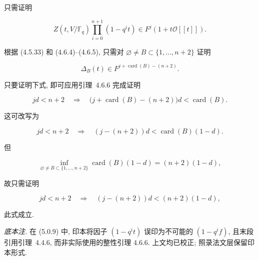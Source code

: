 只需证明

\begin{equation}\tag{5.0.11}
Z(t,V/\mathbb F_q)\prod_{i=0}^{n+1}(1-q^it)
\in F^j(1+t\mathcal O[[t]]).
\end{equation}

根据 (4.5.33) 和 (4.6.4)--(4.6.5), 只需对
$\varnothing\ne B\subset\{1,\ldots,n+2\}$ 证明

\begin{equation}\tag{5.0.12}
\Delta_B(t)\in F^{j+\operatorname{card}(B)-(n+2)}.
\end{equation}

只要证明下式, 即可应用引理~4.6.6 完成证明

\begin{equation}\tag{5.0.13}
jd<n+2
\quad\Longrightarrow\quad
\bigl(j+\operatorname{card}(B)-(n+2)\bigr)d
<\operatorname{card}(B).
\end{equation}

这可改写为

\begin{equation}\tag{5.0.14}
jd<n+2
\quad\Longrightarrow\quad
(j-(n+2))d<\operatorname{card}(B)(1-d).
\end{equation}

但

\[
\inf_{\varnothing\ne B\subset\{1,\ldots,n+2\}}
\operatorname{card}(B)(1-d)
=(n+2)(1-d),
\]

故只需证明

\begin{equation}\tag{5.0.15}
jd<n+2
\quad\Longrightarrow\quad
(j-(n+2))d<(n+2)(1-d),
\end{equation}

此式成立.

\medskip
\noindent\emph{底本注.}
在 (5.0.9) 中, 印本将因子 $(1-q^it)$ 误印为不可能的 $(1-q^if)$,
且末段引用引理~4.4.6, 而非实际使用的整性引理 4.6.6.
上文均已校正; 照录法文层保留印本形式.

